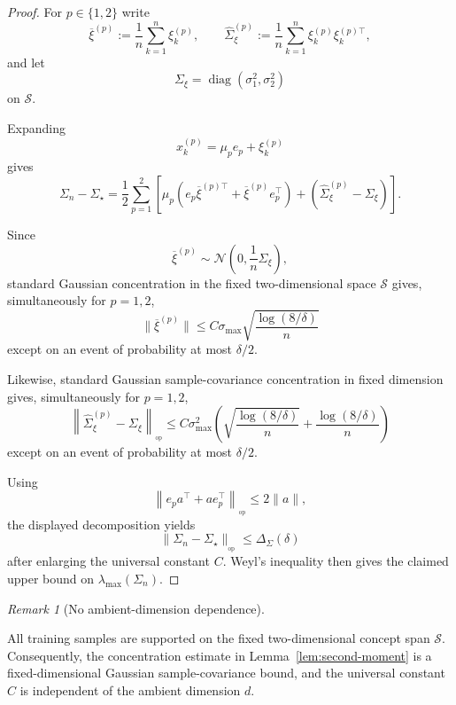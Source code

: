 \documentclass{article} %
\theoremstyle{plain}
\theoremstyle{definition}
\theoremstyle{remark}
\newtheorem{remark}[theorem]{Remark}
\begin{document}
\begin{proof}
For $p\in\{1,2\}$ write
\[
\overline\xi^{(p)}
:=
\frac1n
\sum_{k=1}^n
\xi_k^{(p)},
\qquad
\widehat\Sigma_\xi^{(p)}
:=
\frac1n
\sum_{k=1}^n
\xi_k^{(p)}\xi_k^{(p)\top},
\]
and let
\[
\Sigma_\xi
=
\operatorname{diag}
(\sigma_1^2,\sigma_2^2)
\]
on $\mathcal S$.

Expanding
\[
x_k^{(p)}
=
\mu_p e_p+\xi_k^{(p)}
\]
gives
\[
\Sigma_n-\Sigma_\star
=
\frac12
\sum_{p=1}^2
\left[
\mu_p
\left(
e_p\overline\xi^{(p)\top}
+
\overline\xi^{(p)}e_p^\top
\right)
+
\left(
\widehat\Sigma_\xi^{(p)}
-
\Sigma_\xi
\right)
\right].
\]

Since
\[
\overline\xi^{(p)}
\sim
\mathcal N
\left(
0,\frac1n\Sigma_\xi
\right),
\]
standard Gaussian concentration in the fixed two-dimensional space
$\mathcal S$ gives, simultaneously for $p=1,2$,
\[
\|\overline\xi^{(p)}\|
\le
C\sigma_{\max}
\sqrt{
\frac{\log(8/\delta)}{n}
}
\]
except on an event of probability at most $\delta/2$.

Likewise, standard Gaussian sample-covariance concentration in fixed
dimension gives, simultaneously for $p=1,2$,
\[
\left\|
\widehat\Sigma_\xi^{(p)}
-
\Sigma_\xi
\right\|_{_{\mathrm{op}}}
\le
C\sigma_{\max}^2
\left(
\sqrt{
\frac{\log(8/\delta)}{n}
}
+
\frac{\log(8/\delta)}{n}
\right)
\]
except on an event of probability at most $\delta/2$.

Using
\[
\left\|
e_p a^\top+a e_p^\top
\right\|_{_{\mathrm{op}}}
\le
2\|a\|,
\]
the displayed decomposition yields
\[
\|\Sigma_n-\Sigma_\star\|_{_{\mathrm{op}}}
\le
\Delta_\Sigma(\delta)
\]
after enlarging the universal constant $C$. Weyl's inequality then gives
the claimed upper bound on $\lambda_{\max}(\Sigma_n)$.
\end{proof}

\begin{remark}[No ambient-dimension dependence]
\label{rem:second-moment-dimension}

All training samples are supported on the fixed two-dimensional concept span
$\mathcal S$. Consequently, the concentration estimate in
Lemma~\ref{lem:second-moment} is a fixed-dimensional Gaussian
sample-covariance bound, and the universal constant $C$ is independent of
the ambient dimension $d$.
\end{remark}



\end{document}
